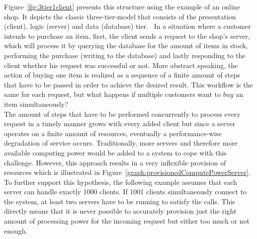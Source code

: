 Figure~\vref{fig:3tier1client} presents this structure using the example of an online shop. It depicts the classic three-tier-model that consists of the presentation (client), logic (server) and data (database) tier.~ In a situation where a customer intends to purchase an item, first, the client sends a request to the shop's server, which will process it by querying the database for the amount of items in stock, performing the purchase (writing to the database) and lastly responding to the client whether his request was successful or not. More abstract speaking, the action of buying one item is realized as a sequence of a finite amount of steps that have to be passed in order to achieve the desired result. This workflow is the same for each request, but what happens if multiple customers want to $buy$ an item simultaneously? \\
The amount of steps that have to be performed concurrently to process every request in a timely manner grows with every added client but since a server operates on a finite amount of resources, eventually a performance-wise degradation of service occurs. Traditionally, more servers and therefore more available computing power would be added to a system to cope with this challenge. However, this approach results in a very inflexible provision of resources which is illustrated in Figure~\vref{graph:provisionedComputePowerServer}. To further support this hypothesis, the following example assumes that each server can handle exactly 1000 clients. If 1001 clients simultaneously connect to the system, at least two servers have to be running to satisfy the calls. This directly means that it is never possible to accurately provision just the right amount of processing power for the incoming request but either too much or not enough. 

